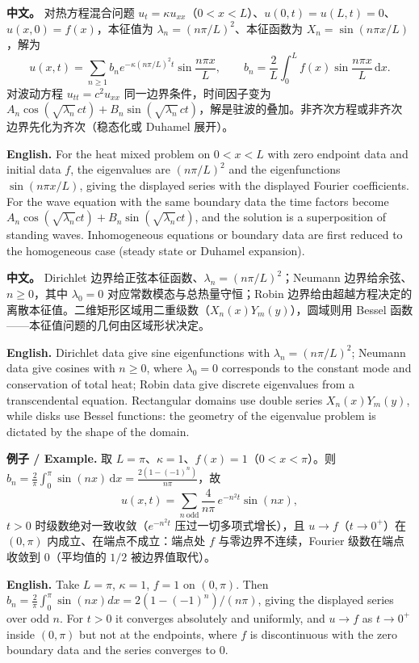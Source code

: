\documentclass[UTF8,11pt,a4paper]{ctexart}
\newcommand{\APS}[2]{\par\noindent\textbf{中文。} #1\par\noindent\textbf{English.} #2\par\smallskip}
\newcommand{\EN}[1]{\par\noindent \textbf{English.} #1\par}
\newcommand{\EX}[2]{\par\noindent \textbf{例子 / Example.} #1\par\EN{#2}}
\newcommand{\dd}{\mathrm{d}}
\begin{document}
\APS{对热方程混合问题 $u_t=\kappa u_{xx}$（$0<x<L$）、$u(0,t)=u(L,t)=0$、$u(x,0)=f(x)$，本征值为 $\lambda_n=(n\pi/L)^2$、本征函数为 $X_n=\sin(n\pi x/L)$，解为
\[
u(x,t)=\sum_{n\ge1}b_ne^{-\kappa(n\pi/L)^2t}\sin\frac{n\pi x}{L},\qquad
b_n=\frac{2}{L}\int_0^Lf(x)\sin\frac{n\pi x}{L}\,\dd x .
\]
对波动方程 $u_{tt}=c^2u_{xx}$ 同一边界条件，时间因子变为 $A_n\cos(\sqrt{\lambda_n}\,ct)+B_n\sin(\sqrt{\lambda_n}\,ct)$，解是驻波的叠加。非齐次方程或非齐次边界先化为齐次（稳态化或 Duhamel 展开）。}{For the heat mixed problem on $0<x<L$ with zero endpoint data and initial data $f$, the eigenvalues are $(n\pi/L)^2$ and the eigenfunctions $\sin(n\pi x/L)$, giving the displayed series with the displayed Fourier coefficients. For the wave equation with the same boundary data the time factors become $A_n\cos(\sqrt{\lambda_n}ct)+B_n\sin(\sqrt{\lambda_n}ct)$, and the solution is a superposition of standing waves. Inhomogeneous equations or boundary data are first reduced to the homogeneous case (steady state or Duhamel expansion).}

\APS{Dirichlet 边界给正弦本征函数、$\lambda_n=(n\pi/L)^2$；Neumann 边界给余弦、$n\ge0$，其中 $\lambda_0=0$ 对应常数模态与总热量守恒；Robin 边界给由超越方程决定的离散本征值。二维矩形区域用二重级数（$X_n(x)Y_m(y)$），圆域则用 Bessel 函数——本征值问题的几何由区域形状决定。}{Dirichlet data give sine eigenfunctions with $\lambda_n=(n\pi/L)^2$; Neumann data give cosines with $n\ge0$, where $\lambda_0=0$ corresponds to the constant mode and conservation of total heat; Robin data give discrete eigenvalues from a transcendental equation. Rectangular domains use double series $X_n(x)Y_m(y)$, while disks use Bessel functions: the geometry of the eigenvalue problem is dictated by the shape of the domain.}

\EX{取 $L=\pi$、$\kappa=1$、$f(x)=1$（$0<x<\pi$）。则 $b_n=\frac{2}{\pi}\int_0^\pi\sin(nx)\,\dd x=\frac{2(1-(-1)^n)}{n\pi}$，故
\[
u(x,t)=\sum_{n\ \text{odd}}\frac{4}{n\pi}\,e^{-n^2t}\sin(nx),
\]
$t>0$ 时级数绝对一致收敛（$e^{-n^2t}$ 压过一切多项式增长），且 $u\to f$（$t\to0^+$）在 $(0,\pi)$ 内成立、在端点不成立：端点处 $f$ 与零边界不连续，Fourier 级数在端点收敛到 $0$（平均值的 $1/2$ 被边界值取代）。}{Take $L=\pi$, $\kappa=1$, $f=1$ on $(0,\pi)$. Then $b_n=\frac{2}{\pi}\int_0^\pi\sin(nx)dx=2(1-(-1)^n)/(n\pi)$, giving the displayed series over odd $n$. For $t>0$ it converges absolutely and uniformly, and $u\to f$ as $t\to0^+$ inside $(0,\pi)$ but not at the endpoints, where $f$ is discontinuous with the zero boundary data and the series converges to $0$.}
\end{document}
